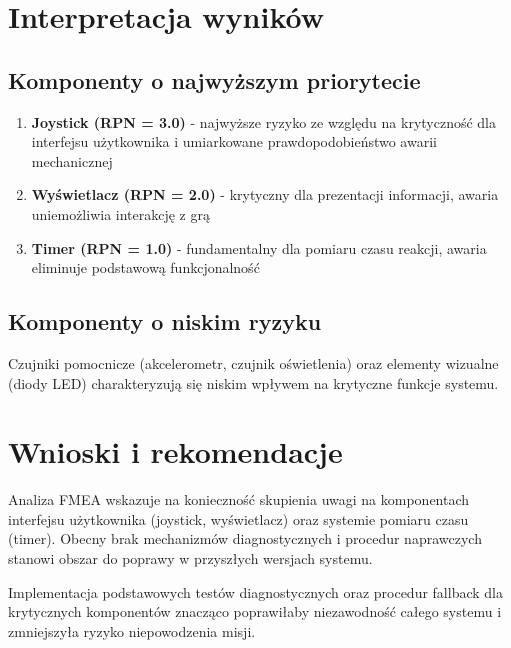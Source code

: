 \documentclass[letterpaper,11pt]{report}
\begin{document}
\flushleft

\section{Interpretacja wyników}

\subsection{Komponenty o najwyższym priorytecie}
\begin{enumerate}
\item \textbf{Joystick (RPN = 3.0)} - najwyższe ryzyko ze względu na krytyczność dla interfejsu użytkownika i umiarkowane prawdopodobieństwo awarii mechanicznej
\item \textbf{Wyświetlacz (RPN = 2.0)} - krytyczny dla prezentacji informacji, awaria uniemożliwia interakcję z grą
\item \textbf{Timer (RPN = 1.0)} - fundamentalny dla pomiaru czasu reakcji, awaria eliminuje podstawową funkcjonalność
\end{enumerate}

\subsection{Komponenty o niskim ryzyku}
Czujniki pomocnicze (akcelerometr, czujnik oświetlenia) oraz elementy wizualne (diody LED) charakteryzują się niskim wpływem na krytyczne funkcje systemu.

\section{Wnioski i rekomendacje}

Analiza FMEA wskazuje na konieczność skupienia uwagi na komponentach interfejsu użytkownika (joystick, wyświetlacz) oraz systemie pomiaru czasu (timer). Obecny brak mechanizmów diagnostycznych i procedur naprawczych stanowi obszar do poprawy w przyszłych wersjach systemu.

Implementacja podstawowych testów diagnostycznych oraz procedur fallback dla krytycznych komponentów znacząco poprawiłaby niezawodność całego systemu i zmniejszyła ryzyko niepowodzenia misji.
\end{document}
